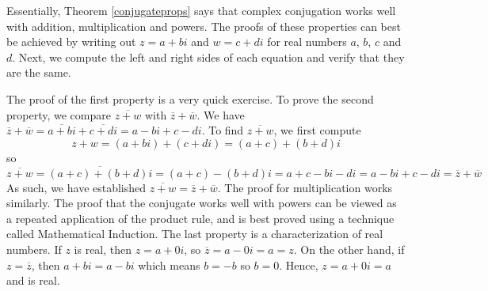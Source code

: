 
\medskip

Essentially, Theorem \ref{conjugateprops} says that complex conjugation works well with addition, multiplication and powers.  The proofs of these properties can best be achieved by writing out $z = a+bi$ and $w = c+di$ for real numbers $a$, $b$, $c$ and $d$.   Next, we compute the left and right sides of each equation and verify that they are the same.  

\smallskip

The proof of the first property is a very quick exercise.  To prove the second property, we compare $\overline{z+w}$ with $\overline{z} + \overline{w}$.  We have $\overline{z} + \overline{w} = \overline{a+bi} + \overline{c+di}  = a-bi + c-di$.  To find $\overline{z+w}$, we first compute \[z+w = (a+bi) + (c+di) = (a+c)+(b+d)i\] so \[\overline{z+w} = \overline{(a+c)+(b+d)i} = (a+c) - (b+d)i = a+c - bi - di = a - bi + c - di = \overline{z} + \overline{w}\]  As such, we have established  $\overline{z+w} = \overline{z}+\overline{w}$. The proof for multiplication works similarly.  The proof that the conjugate works well with powers can be viewed as a repeated application of the product rule, and is best proved using a technique called Mathematical Induction.  The last property is a characterization of real numbers.  If $z$ is real, then $z = a + 0i$, so $\overline{z} = a - 0i = a = z$.  On the other hand, if $z=\overline{z}$, then $a+bi = a - bi$ which means $b=-b$ so $b=0$.  Hence, $z = a +0i = a$ and is real.

